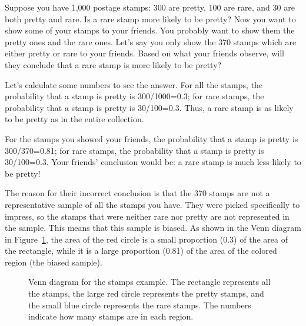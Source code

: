 \begin{example}
  Suppose you have 1,000 postage stamps: 300 are pretty, 100 are rare, and 30 are
  both pretty and rare. Is a rare stamp more likely to be pretty?  Now you want
  to show some of your stamps to your friends. You probably want to show them
  the pretty ones and the rare ones. Let's say you only show the 370 stamps which
  are either pretty or rare to your friends. Based on what your friends
  observe, will they conclude that a rare stamp is more likely to be pretty?

Let's calculate some numbers to see the answer. For all the stamps, the
probability that a stamp is pretty is 300/1000=0.3; for rare stamps, the
probability that a stamp is pretty is 30/100=0.3. Thus, a rare stamp is as
likely to be pretty as in the entire collection.

For the stamps you showed your friends, the probability that a stamp is pretty is
300/370=0.81; for rare stamps, the probability that a stamp is pretty is
30/100=0.3. Your friends' conclusion would be: a rare stamp is much less likely
to be pretty!

The reason for their incorrect conclusion is that the 370 stamps are not a
representative sample of all the stamps you have. They were picked
specifically to impress, so the stamps that were neither rare nor pretty
are not represented in the sample. This means that this sample is biased.
As shown in the Venn diagram in Figure~\ref{fig:ch7:stamps}, the area of the red
circle is a small proportion (0.3) of the area of the rectangle, while it is a
large proportion (0.81) of the area of the colored region (the biased sample). 

\begin{figure}[H]
\caption{Venn diagram for the stamps example. The rectangle represents all the
  stamps, the large red circle represents the pretty stamps, and the small blue
  circle represents the rare stamps. The numbers indicate how many stamps are in
  each region.}
  \label{fig:ch7:stamps}
\end{figure}
\end{example}

